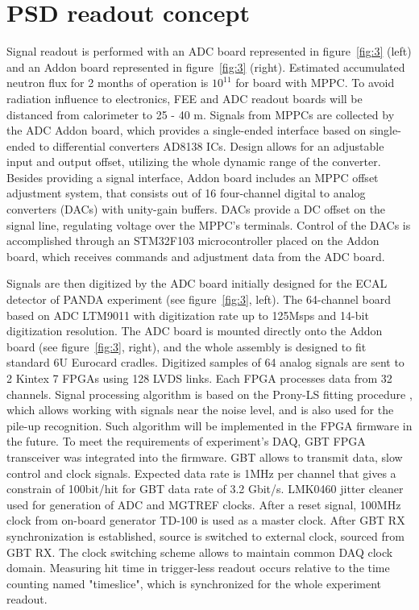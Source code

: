 \documentclass[a4paper,11pt]{article}
\begin{document}
\section{PSD readout concept}
Signal readout is performed with an ADC board represented in figure~\ref{fig:3} (left) and an Addon board represented in figure~\ref{fig:3} (right). Estimated accumulated neutron flux for 2 months of operation is $10^11$ for board with MPPC. To avoid radiation influence to electronics, FEE and ADC readout boards will be distanced from calorimeter to 25 - 40 m. Signals from MPPCs are collected by the ADC Addon board, which provides a single-ended interface based on single-ended to differential converters AD8138 ICs. Design allows for an adjustable input and output offset, utilizing the whole dynamic range of the converter. Besides providing a signal interface, Addon board includes an MPPC offset adjustment system, that consists out of 16 four-channel digital to analog converters (DACs) with unity-gain buffers. DACs provide a DC offset on the signal line, regulating voltage over the MPPC's terminals. Control of the DACs is accomplished through an STM32F103 microcontroller placed on the Addon board, which receives commands and adjustment data from the ADC board.

Signals are then digitized by the ADC board initially designed for the ECAL detector of PANDA experiment \cite{4} (see figure~\ref{fig:3}, left). The 64-channel board based on ADC LTM9011 with digitization rate up to 125Msps and 14-bit digitization resolution. The ADC board is mounted directly onto the Addon board (see figure~\ref{fig:3}, right), and the whole assembly is designed to fit standard 6U Eurocard cradles.
Digitized samples of 64 analog signals are sent to 2 Kintex 7 FPGAs  using 128 LVDS links. Each FPGA processes data from 32 channels. Signal
processing algorithm is based on the Prony-LS fitting procedure \cite{5}, which allows working with signals near the noise level, and is also used for the pile-up recognition. Such algorithm will be implemented in the FPGA firmware in the future.
To meet the requirements of experiment's DAQ, GBT FPGA transceiver was integrated into the firmware. GBT allows to transmit data, slow control and clock signals. Expected data rate is 1MHz per channel that gives a constrain of 100bit/hit for GBT data rate of 3.2 Gbit/s. 
LMK0460 jitter cleaner used for generation of ADC and MGTREF clocks. After a reset signal, 100MHz clock from on-board generator TD-100 is used as a master clock. After GBT RX synchronization is established, source is switched to external clock, sourced from GBT RX. The clock switching scheme allows to maintain common DAQ clock domain. Measuring hit time in trigger-less readout occurs relative to the time counting named "timeslice", which is synchronized for the whole experiment readout.
\end{document}
